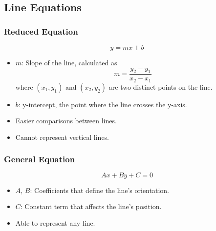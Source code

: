 \subsection{Line Equations}

\subsubsection{Reduced Equation}
\[
y = mx + b
\]
\begin{itemize}
    \item \(m\): Slope of the line, calculated as 
    \[
    m = \frac{y_2 - y_1}{x_2 - x_1}
    \]
    where \((x_1, y_1)\) and \((x_2, y_2)\) are two distinct points on the line.
    \item \(b\): y-intercept, the point where the line crosses the y-axis.
    \item Easier comparisons between lines.
    \item Cannot represent vertical lines.
\end{itemize}

\subsubsection{General Equation}
\[
Ax + By + C = 0
\]
\begin{itemize}
    \item \(A\), \(B\): Coefficients that define the line's orientation.
    \item \(C\): Constant term that affects the line's position.
    \item Able to represent any line.
\end{itemize}
